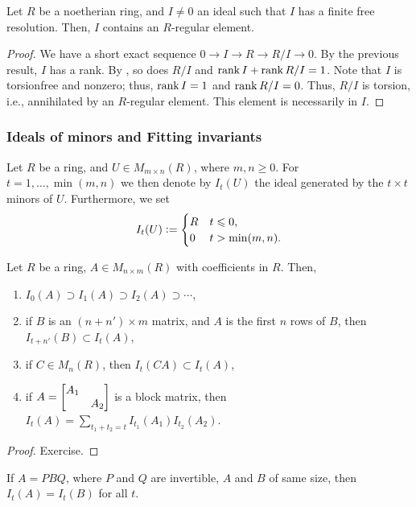 \documentclass[12pt]{article}
\begin{document}
\begin{cor}
	Let $R$ be a noetherian ring, and $I \neq 0$ an ideal such that $I$ has a finite free resolution. Then, $I$ contains an $R$-regular element.
\end{cor}
\begin{proof} 
	We have a short exact sequence $0 \to I \to R \to R/I \to 0$. By the previous result, $I$ has a rank. By , so does $R/I$ and $\rank I + \rank R/I = 1$. Note that $I$ is torsionfree and nonzero; thus, $\rank I = 1$ and $\rank R/I = 0$. Thus, $R/I$ is torsion, i.e., annihilated by an $R$-regular element. This element is necessarily in $I$.
\end{proof}

\subsubsection{Ideals of minors and Fitting invariants}

\begin{defn}
	Let $R$ be a ring, and $U \in M_{m \times n}(R)$, where $m, n \ge 0$. For $t = 1, \ldots, \min(m, n)$ we then denote by $I_{t}(U)$ the ideal generated by the $t \times t$ minors of $U$. Furthermore, we set 
	\begin{equation*} 
		I_{t}(U) \vcentcolon= 
		\begin{cases}
			R & t \le 0, \\
			0 & t > \min(m, n).
		\end{cases}
	\end{equation*}
\end{defn}

\begin{prop}
	Let $R$ be a ring, $A \in M_{n \times m}(R)$ with coefficients in $R$. Then,
	\begin{enumerate}[label=(\alph*)]
		\item $I_{0}(A) \supset I_{1}(A) \supset I_{2}(A) \supset \cdots$,
		\item if $B$ is an $(n + n') \times m$ matrix, and $A$ is the first $n$ rows of $B$, then $I_{t + n'}(B) \subset I_{t}(A)$,
		\item if $C \in M_{n}(R)$, then $I_{t}(C A) \subset I_{t}(A)$,
		\item if $A = \two{A_{1}}{}{}{A_{2}}$ is a block matrix, then $I_{t}(A) = \sum_{t_{1} + t_{2} = t} I_{t_{1}}(A_{1}) I_{t_{2}}(A_{2})$.
	\end{enumerate}
\end{prop}
\begin{proof} 
	Exercise.
\end{proof}
\begin{cor}
	If $A = P B Q$, where $P$ and $Q$ are invertible, $A$ and $B$ of same size, then $I_{t}(A) = I_{t}(B)$ for all $t$.
\end{cor}
\end{document}

